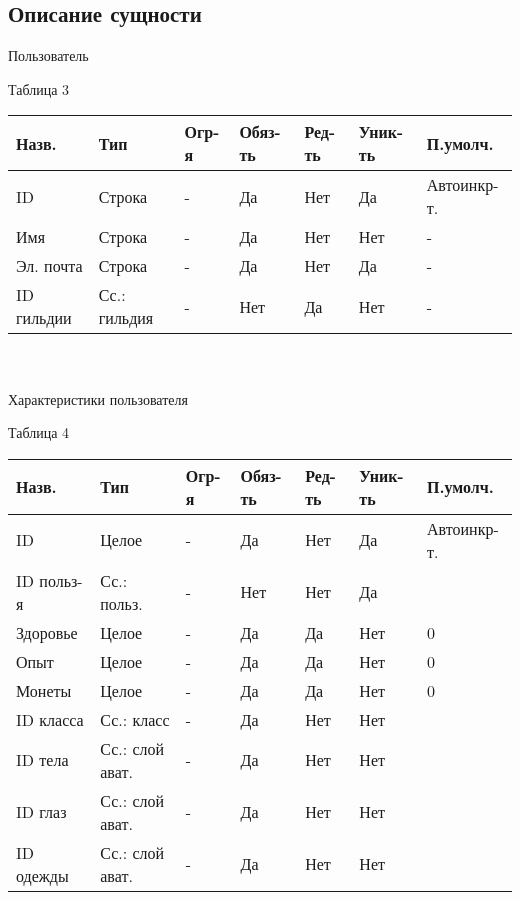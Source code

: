 \documentclass[../document.tex]{subfiles}
\begin{document}
\subsection{Описание сущности}
Пользователь
\begin{flushright}
  Таблица 3
\end{flushright}
\begin{tabular}{ | l | l | l | l | l | l | l | }
  \hline
  Назв.      & Тип          & Огр-я & Обяз-ть & Ред-ть & Уник-ть & П.умолч.    \\
  \hline
  ID         & Строка       & -     & Да      & Нет    & Да      & Автоинкр-т. \\
  Имя        & Строка       & -     & Да      & Нет    & Нет     & -           \\
  Эл. почта  & Строка       & -     & Да      & Нет    & Да      & -           \\
  ID гильдии & Сс.: гильдия & -     & Нет     & Да     & Нет     & -           \\
  \hline
\end{tabular}
\\\\
Характеристики пользователя
\begin{flushright}
  Таблица 4
\end{flushright}
\begin{tabular}{ | l | l | l | l | l | l | l | }
  \hline
  Назв.      & Тип             & Огр-я & Обяз-ть & Ред-ть & Уник-ть & П.умолч.    \\
  \hline
  ID         & Целое           & -     & Да      & Нет    & Да      & Автоинкр-т. \\
  ID польз-я & Сс.: польз.     & -     & Нет     & Нет    & Да      &             \\
  Здоровье   & Целое           & -     & Да      & Да     & Нет     & 0           \\
  Опыт       & Целое           & -     & Да      & Да     & Нет     & 0           \\
  Монеты     & Целое           & -     & Да      & Да     & Нет     & 0           \\
  ID класса  & Сс.: класс      & -     & Да      & Нет    & Нет     &             \\
  ID тела    & Сс.: слой ават. & -     & Да      & Нет    & Нет     &             \\
  ID глаз    & Сс.: слой ават. & -     & Да      & Нет    & Нет     &             \\
  ID одежды  & Сс.: слой ават. & -     & Да      & Нет    & Нет     &             \\
  \hline
\end{tabular}
\end{document}
